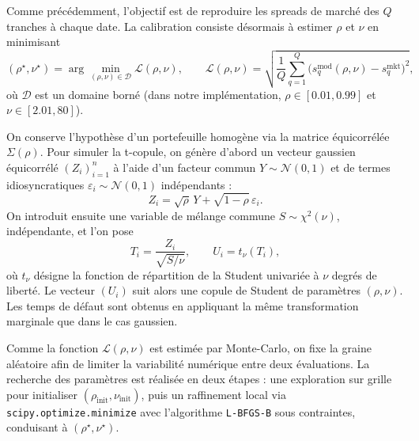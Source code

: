 Comme précédemment, l’objectif est de reproduire les spreads de marché des \(Q\) tranches à
chaque date. La calibration consiste désormais à estimer \(\rho\) et \(\nu\) en minimisant
\[
(\rho^\star,\nu^\star)
= \arg\min_{(\rho,\nu)\in\mathcal{D}} \mathcal{L}(\rho,\nu),
\qquad
\mathcal{L}(\rho,\nu)
= \sqrt{\frac{1}{Q}\sum_{q=1}^Q\big(s_q^{\mathrm{mod}}(\rho,\nu)-s_q^{\mathrm{mkt}}\big)^2},
\]
où \(\mathcal{D}\) est un domaine borné (dans notre implémentation,
\(\rho\in[0.01,0.99]\) et \(\nu\in[2.01,80]\)).

On conserve l’hypothèse d’un portefeuille homogène via la matrice équicorrélée \(\Sigma(\rho)\).
Pour simuler la t-copule, on génère d’abord un vecteur gaussien équicorrélé \((Z_i)_{i=1}^n\)
à l’aide d’un facteur commun \(Y\sim\mathcal{N}(0,1)\) et de termes idiosyncratiques
\(\varepsilon_i\sim\mathcal{N}(0,1)\) indépendants :
\[
Z_i=\sqrt{\rho}\,Y+\sqrt{1-\rho}\,\varepsilon_i.
\]
On introduit ensuite une variable de mélange commune \(S\sim\chi^2(\nu)\), indépendante, et l’on pose
\[
T_i=\frac{Z_i}{\sqrt{S/\nu}},
\qquad
U_i=t_\nu(T_i),
\]
où \(t_\nu\) désigne la fonction de répartition de la Student univariée à \(\nu\) degrés de liberté.
Le vecteur \((U_i)\) suit alors une copule de Student de paramètres \((\rho,\nu)\). Les temps de défaut
sont obtenus en appliquant la même transformation marginale que dans le cas gaussien.

Comme la fonction \(\mathcal{L}(\rho,\nu)\) est estimée par Monte-Carlo, on fixe la graine aléatoire afin
de limiter la variabilité numérique entre deux évaluations. La recherche des paramètres est réalisée en
deux étapes : une exploration sur grille pour initialiser \((\rho_{\mathrm{init}},\nu_{\mathrm{init}})\),
puis un raffinement local via \texttt{scipy.optimize.minimize} avec l’algorithme \texttt{L-BFGS-B} sous
contraintes, conduisant à \((\rho^\star,\nu^\star)\).






